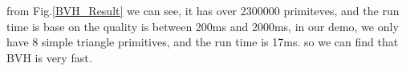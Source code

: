 \documentclass[conference]{IEEEtran}
\begin{document}
from Fig.\ref{BVH_Result} we can see, it has over 2300000 primiteves, and the run time is base on the quality is between 200ms and 2000ms, in our demo, we 
only have 8 simple triangle primitives, and the run time is 17ms. so we can find that BVH is very fast.



\end{document}
